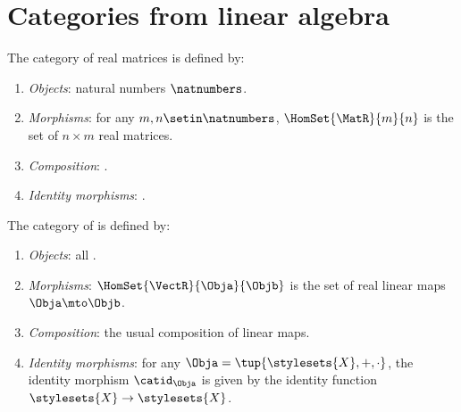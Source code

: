 
\section[Categories from linear algebra]{Categories from linear algebra}
\label{sec:cats-of-linear-algebra}

\begin{ctdefinition}
    \label{def:cat-of-real-matrices}
    The category \MatR of real matrices is defined by:
    \begin{enumerate}
        \item \emph{Objects}: natural numbers $\natnumbers$.
         \item \emph{Morphisms}: for any $m, n \setin \natnumbers$, $\HomSet{\MatR}{m}{n}$ is the set  of $n \times m$ real matrices.
        \item \emph{Composition}: .
        \item \emph{Identity morphisms}: .
    \end{enumerate}
\end{ctdefinition}

\begin{ctdefinition}
    \label{def:cat-of-real-vector-spaces}
    The category \VectR of  is defined by:
    \begin{enumerate}
        \item \emph{Objects}: all .
        \item \emph{Morphisms}: $\HomSet{\VectR}{\Obja}{\Objb}$ is the set of real linear maps $\Obja \mto \Objb$.
        \item \emph{Composition}: the usual composition of linear maps.
        \item \emph{Identity morphisms}: for any  $\Obja = \tup{\stylesets{X}, {{+}},{{ \cdot}}}$, the identity morphism $\catid_\Obja$ is given by the identity function $\stylesets{X} \to \stylesets{X}$.
    \end{enumerate}
\end{ctdefinition}

